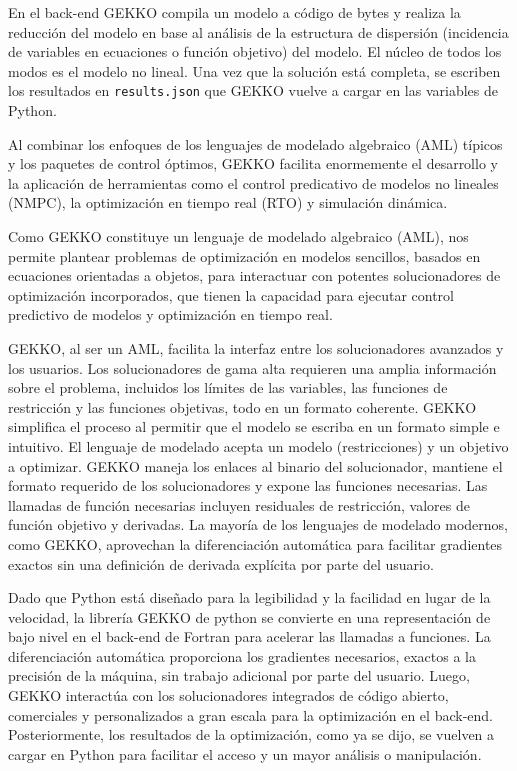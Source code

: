 \documentclass[twoside]{article}
\begin{document}
\begin{multicols}{2}
En el back-end GEKKO compila un modelo a c\'odigo de bytes y realiza la reducci\'on del modelo en base al an\'alisis de la estructura de dispersi\'on (incidencia de variables en ecuaciones o funci\'on objetivo) del modelo. El n\'ucleo de todos los modos es el modelo no lineal. Una vez que la soluci\'on est\'a completa, se escriben los resultados en \texttt{results.json} que GEKKO vuelve a cargar en las variables de Python.

Al combinar los enfoques de los lenguajes de modelado algebraico (AML) t\'ipicos y los paquetes de control \'optimos, GEKKO facilita enormemente el desarrollo y la aplicaci\'on de herramientas como el control predicativo de modelos no lineales (NMPC), la optimizaci\'on en tiempo real (RTO) y simulaci\'on din\'amica.

Como GEKKO constituye un lenguaje de modelado algebraico (AML), nos permite plantear problemas de optimizaci\'on en modelos sencillos, basados en ecuaciones orientadas a objetos, para interactuar con potentes solucionadores de optimizaci\'on incorporados, que tienen la capacidad para ejecutar control predictivo de modelos y optimizaci\'on en tiempo real.

GEKKO, al ser un AML, facilita la interfaz entre los solucionadores avanzados y los usuarios. Los solucionadores de gama alta requieren una amplia informaci\'on sobre el problema, incluidos los l\'imites de las variables, las funciones de restricci\'on y las funciones objetivas, todo en un formato coherente. GEKKO simplifica el proceso al permitir que el modelo se escriba en un formato simple e intuitivo. El lenguaje de modelado acepta un modelo (restricciones) y un objetivo a optimizar. GEKKO maneja los enlaces al binario del solucionador, mantiene el formato requerido de los solucionadores y expone las funciones necesarias. Las llamadas de funci\'on necesarias incluyen residuales de restricci\'on, valores de funci\'on objetivo y derivadas. La mayor\'ia de los lenguajes de modelado modernos, como GEKKO, aprovechan la diferenciaci\'on autom\'atica  para facilitar gradientes exactos sin una definici\'on de derivada expl\'icita por parte del usuario.

Dado que Python est\'a dise\~nado para la legibilidad y la facilidad en lugar de la velocidad, la librer\'ia GEKKO de python se convierte en una representaci\'on de bajo nivel en el back-end de Fortran para acelerar las llamadas a funciones. La diferenciaci\'on autom\'atica proporciona los gradientes necesarios, exactos a la precisi\'on de la m\'aquina, sin trabajo adicional por parte del usuario. Luego, GEKKO interact\'ua con los solucionadores integrados de c\'odigo abierto, comerciales y personalizados a gran escala para la optimizaci\'on en el back-end. Posteriormente, los resultados de la optimizaci\'on, como ya se dijo, se vuelven a cargar en Python para facilitar el acceso y un mayor an\'alisis o manipulaci\'on.


\end{multicols}
\end{document}
